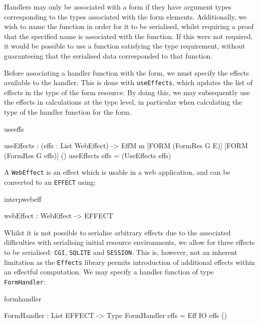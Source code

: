 Handlers may only be associated with a form if they have argument types
corresponding to the types associated with the form elements. Additionally, we
wish to name the function in order for it to be serialised, whilst requiring a
proof that the specified name is associated with the function. If this were not
required, it would be possible to use a function satisfying the type
requirement, without guaranteeing that the serialised data corresponded to
that function.

Before associating a handler function with the form, we must specify the
effects available to the handler. This is done with
\texttt{useEffects}, which updates the list of effects in the type of the form
resource. By doing this, we may subsequently use the effects in calculations at
the type level, in particular when calculating the type of the handler function
for the form. 

\begin{SaveVerbatim}{useeffs}

useEffects : (effs : List WebEffect) ->
             EffM m [FORM (FormRes G E)] 
                    [FORM (FormRes G effs)] ()
useEffects effs = (UseEffects effs)

\end{SaveVerbatim}

\noindent
A \texttt{WebEffect} is an effect which is usable in a web application, and can
be converted to an \texttt{EFFECT} using:

\begin{SaveVerbatim}{interpwebeff}

webEffect : WebEffect -> EFFECT

\end{SaveVerbatim}

Whilst it is not possible to serialise arbitrary effects due to the associated
difficulties with serialising initial resource environments, we allow for three
effects to be serialised: \texttt{CGI}, \texttt{SQLITE} and \texttt{SESSION}.
This is, however, not an inherent limitation as the \texttt{Effects} library
permits introduction of additional effects within an effectful computation.
%
We may specify a handler function of type \texttt{FormHandler}:

\begin{SaveVerbatim}{formhandler}

FormHandler : List EFFECT -> Type
FormHandler effs = Eff IO effs ()

\end{SaveVerbatim}

